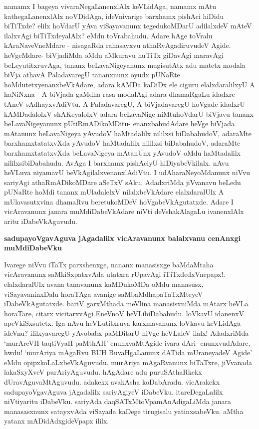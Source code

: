 \noindent
namamx I bageya vivaraNegaLanenxlAlx keVLidAga, namamx mAtu kathegaLanenxlAlx noVDidAga, ideVnivarige barxhamx pishAci hiDidu biTiTxde? elilx hoVdarU yAva viSayavanunx tegedukoMDarU adilalxdeV mAteV ilalxvAgi biTiTxdeyalAlx? eMdu toVrabahudu. Adare hAge toVralu kAraNaveVneMdare - nisagaRda rahasayxvu athaRvAgadiruvudeV Agide. heVgeMdare- biVjadiMda oMdu aMkuravu huTiTx giDavAgi maravAgi beLeyutitxruvAga, tananx beLavaNigeyanunx mugisutAtx adu matetx modala biVja athavA PaladavaregU tananxnunx oyudx pUNaRte hoMdutetxyenanxbeVkAdare, adara kAMDa kaDiDx ele ciguru elalxdaralilxyU A haNiNxna - A biVjada gaMdha rasa modalAgi adara dhamaRgaLu idadxre tAneV sAdhayxvAdiVtu. A PaladavaregU, A biVjadavaregU hoVgade idadxrU kAMDadalolxV shAKeyalolxV adara beLavaNige niMtuhoVdarU biVjavu tananx beLavaNigeyanunx pUtiRmADikoMDitu- enanxbahudAdare heVge biVjada mAtanunx beLavaNigeya yAvudoV haMtadalilx nililxsi biDabahudoV, adaraMte barxhamxtatatxvXda yAvudoV haMtadalilx nililxsi biDabahudoV, adaraMte barxhamxtatatxvXda beLavaNigeya mAtanUnx yAvudoV oMdu haMtadalilx nililxsibiDabahudu. AvAga I barxhamx pishAciyU hiDiyabeVkilalx. nAvu heVLuva niyamavU beVkAgilalxvenanxlAdiVtu. I udAharaNeyoMdanunx niVvu sariyAgi athaRmADikoMDare aSeTxV sAku. AdadxriMda jiVvanavu beLedu pUNaRte hoMdi tananx mUladalelxV nilalxbeVkAdare elalxdaralUlx A mUlavasutxvina dhamaRvu beretukoMDeV hoVgabeVkAgutatxde. Adare I vicAravanunx janara muMdiDabeVkAdare niVti deVshakAlagaLu ivanenxlAlx aritu iDabeVkAguvudu.

{\bigskip
\noindent
{\large\bf sadupayoVgavAguva jAgadalilx vicAravanunx balalxvanu cenAnxgi muMdiDabeVku}}\label{page248}
\medskip

\noindent
Ivarege niVvu iTaTx parxshenxge, nananx manasisxge baMdaMtaha vicAravanunx saMkiSxpatxvAda utatxra rUpavAgi iTiTxdedxVnepapx!. elalxdaralUlx avana tanavanunx kaMDukoMDa oMdu manasusx, viSayavaninxDalu horaTAga avanige saMbaMdhapaTaTxMteyeV iDabeVkAgutatxde. bariV garxMthada meVlina manasisxniMda mAtarx heVLa horaTare, citarx vicitarxvAgi EneVnoV heVLibiDabahudu. loVkavU idanenxV apeVkiSxsutetx. Iga nAvu heVLutitxruva karxmavanunx loVkavu keVLidAga ideVnu? ililxyavaregU yAvobabx paMDitarU hiVge heVLaleV ilalx! AdadxriMda `murAreVH taqtiVyaH paMthAH'\label{248} enunxvaMtAgide ivara dAri- enunxvudAdare, hwdu! `murAriya mAgaRvu BUH BuvaHgaLanunx dATida mUraneyadeV Agide' eMdu opipxkoLaLxbeVkAguvudu. murAriya mAgaRvanunx biTaTxre, jiVvanada lakaSxyXveV parAriyAguvudu. hAgAdare adu puruSAthaRkekx dUravAguvaMtAguvudu. adakekx avakAsha koDabAradu. vicArakekx sadupayoVgavAguva jAgadalilx sariyAgiyeV iDabeVku. itareDegaLalilx niVtiyaritu iDabeVku. sariyAda daqSATxMtoVpamAnAdigaLiMda janara manasasxnunx satayxvAda viSayada kaDege tirugisalu yatinxsabeVku. aMtha yatanx mADidAdxgideVpapx ililx.

